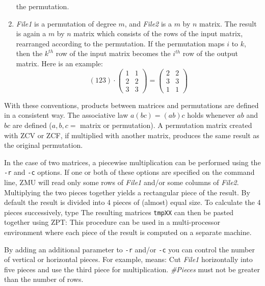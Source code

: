 \begin{enumerate}
	the permutation.
\item	{\it File1} is a permutation of degree $m$, and {\it File2} is
	a $m$ by $n$ matrix. The result is again a $m$ by $n$ matrix
	which consists of the rows of the input matrix, rearranged
	according to the permutation. If the permutation maps $i$ to
	$k$, then the $k^{th}$ row of the input matrix becomes the
	$i^{th}$ row of the output matrix.
	Here is an example:
	\[
		(123)\cdot\left(\begin{array}{cc}
		1&1\\2&2\\3&3\end{array}\right)
		=
		\left(\begin{array}{cc}
		2&2\\3&3\\1&1\end{array}\right)
	\]
\end{enumerate}

With these conventions, products between matrices and permutations are
defined in a consistent way. The associative law $a(bc)=(ab)c$
holds whenever $ab$ and $bc$ are defined ($a,b,c=$ matrix or
permutation). A permutation matrix created with ZCV or ZCF, if
multiplied with another matrix, produces the same result as the
original permutation.

In the case of two matrices, a piecewise multiplication can be
performed using the {\tt -r} and {\tt -c} options. If one or both of
these options are specified on the command line, ZMU will read only
some rows of {\it File1} and/or some columns of {\it File2}.
Multiplying the two pieces together yields a rectangular piece of the
result. By default the result is divided into 4 pieces of (almost)
equal size. To calculate the 4 pieces successively, type
The resulting matrices {\tt tmpXX} can then be pasted together
using ZPT:
This procedure can be used in a multi-processor environment
where each piece of the result is computed on a separate machine.

By adding an additional parameter to {\tt -r} and/or {\tt -c} you can
control the number of vertical or horizontal pieces. For example,
means: Cut {\em File1} horizontally into five pieces and use the third
piece for multiplication. {\it \#Pieces} must not be greater than the
number of rows.

